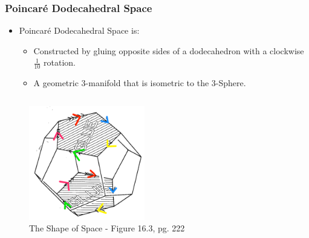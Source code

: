 \documentclass[13pt]{beamer}
\begin{document}
\begin{frame}
\frametitle{Poincar\'e Dodecahedral Space}
  \begin{itemize}
    \item \alert{Poincar\'e Dodecahedral Space} is:
          \begin{itemize}
             \item Constructed by gluing opposite sides of a dodecahedron with a clockwise $\frac{1}{10}$ rotation.
             \item A geometric 3-manifold that is isometric to the 3-Sphere.
           \end{itemize} 
  \end{itemize}

  \begin{columns}[c] %
     \centering
      \begin{figure}
        \includegraphics[height=5cm]{./img/one_tenth}
        \caption{The Shape of Space - Figure 16.3, pg. 222}
      \end{figure}
  \end{columns}
\end{frame}
\end{document}
